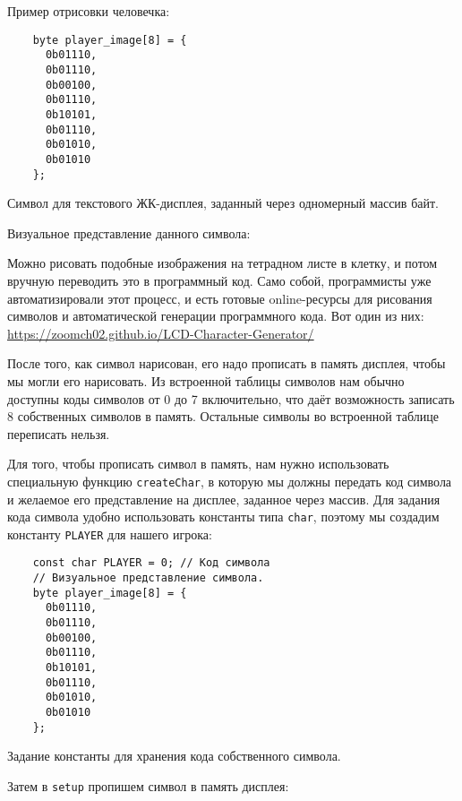 \documentclass[../sparc.tex]{subfiles}
\begin{document}
Пример отрисовки человечка:

\begin{listing}[H]
  \begin{verbatim}
    byte player_image[8] = {
      0b01110,
      0b01110,
      0b00100,
      0b01110,
      0b10101,
      0b01110,
      0b01010,
      0b01010
    };
  \end{verbatim}
  \caption{Символ для текстового ЖК-дисплея, заданный через одномерный массив
    байт.}
  \label{listing:game-dev-lcd-custom-char}
\end{listing}

Визуальное представление данного символа:


Можно рисовать подобные изображения на тетрадном листе в клетку, и потом вручную
переводить это в программный код.  Само собой, программисты уже автоматизировали
этот процесс, и есть готовые online-ресурсы для рисования символов и
автоматической генерации программного кода.  Вот один из них:
\url{https://zoomch02.github.io/LCD-Character-Generator/}

После того, как символ нарисован, его надо прописать в память дисплея, чтобы мы
могли его нарисовать.  Из встроенной таблицы символов нам обычно доступны коды
символов от 0 до 7 включительно, что даёт возможность записать 8 собственных
символов в память.  Остальные символы во встроенной таблице переписать нельзя.

Для того, чтобы прописать символ в память, нам нужно использовать специальную
функцию \texttt{createChar}, в которую мы должны передать код символа и желаемое
его представление на дисплее, заданное через массив.  Для задания кода символа
удобно использовать константы типа \texttt{char}, поэтому мы создадим константу
\texttt{PLAYER} для нашего игрока:

\begin{listing}[H]
  \begin{verbatim}
    const char PLAYER = 0; // Код символа
    // Визуальное представление символа.
    byte player_image[8] = {
      0b01110,
      0b01110,
      0b00100,
      0b01110,
      0b10101,
      0b01110,
      0b01010,
      0b01010
    };
  \end{verbatim}
  \caption{Задание константы для хранения кода собственного символа.}
  \label{listing:game-dev-lcd-custom-char-const}
\end{listing}

Затем в \texttt{setup} пропишем символ в память дисплея:
\end{document}
